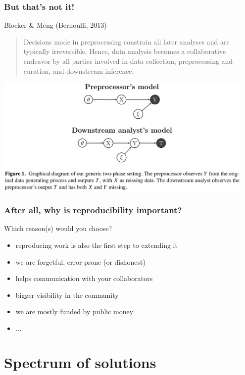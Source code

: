 \documentclass[c]{beamer} %
\begin{document}
\begin{frame}
  \frametitle{But that's not it!}
  \small
  Blocker \& Meng (Bernoulli, 2013)
  \begin{quote}
    Decisions made in preprocessing constrain all later analyses and are typically irreversible. Hence, data analysis becomes a collaborative endeavor by all parties involved in data collection, preprocessing and curation, and downstream inference.
  \end{quote}
  \normalsize
  
  \begin{center}
    \includegraphics[width=0.95\textwidth,height=0.90\textheight,keepaspectratio=true,clip=true,trim=0 120 0 0]{blocker_13_preprocessing_fig1}%
  \end{center}
\end{frame}

\begin{frame}
  \frametitle{After all, why is reproducibility important?}
  Which reason(s) would you choose?
  \bigskip
  \pause
  \begin{itemize}
  \item reproducing work is also the first step to extending it
    \medskip
  \item we are forgetful, error-prone (or dishonest)
    \medskip
  \item helps communication with your collaborators
    \medskip
  \item bigger visibility in the community
    \medskip
  \item we are mostly funded by public money
    \medskip
  \item ...
  \end{itemize}
\end{frame}

\section{Spectrum of solutions}
\end{document}
